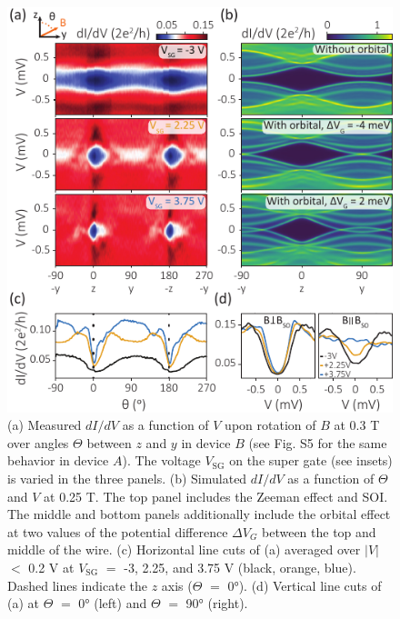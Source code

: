 \begin{figure}
\includegraphics[width=\columnwidth]{chapter_spinorbit/figures/Fig3.pdf}
\caption{\label{fig:fig3}
(a) Measured $dI/dV$ as a function of $V$ upon rotation of $B$ at 0.3 T over angles $\Theta$ between $z$ and $y$ in device $B$ (see Fig. S5 \cite{Note1} for the same behavior in device $A$).
The voltage $V_{\mathrm{SG}}$ on the super gate (see insets) is varied in the three panels.
(b) Simulated $dI/dV$ as a function of $\Theta$ and $V$ at 0.25 T.
The top panel includes the Zeeman effect and SOI.
The middle and bottom panels additionally include the orbital effect at two values of the potential difference $\Delta V_G$ between the top and middle of the wire.
(c) Horizontal line cuts of (a) averaged over $|V|$ $<$ 0.2 V at $V_{\mathrm{SG}}$ $=$ -3,  2.25, and 3.75 V (black, orange, blue).
Dashed lines indicate the $z$ axis ($\Theta$ $=$ \ang{0}).
(d) Vertical line cuts of (a) at $\Theta$ $=$ \ang{0} (left) and $\Theta$ $=$ \ang{90} (right).
}
\end{figure}

